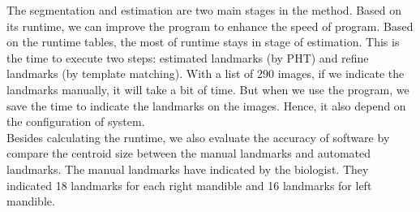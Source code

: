 The segmentation and estimation are two main stages in the method. Based on its runtime, we can improve the program to enhance the speed of program. Based on the runtime tables, the most of runtime stays in stage of estimation. This is the time to execute two steps: estimated landmarks (by PHT) and refine landmarks (by template matching). With a list of 290 images, if we indicate the landmarks manually, it will take a bit of time. But when we use the program, we save the time to indicate the landmarks on the images. Hence, it also depend on the configuration of system.\\[0.2cm]
Besides calculating the runtime, we also evaluate the accuracy of software by compare the centroid size between the manual landmarks and automated landmarks. The manual landmarks have indicated by the biologist. They indicated 18 landmarks for each right mandible and 16 landmarks for left mandible.
